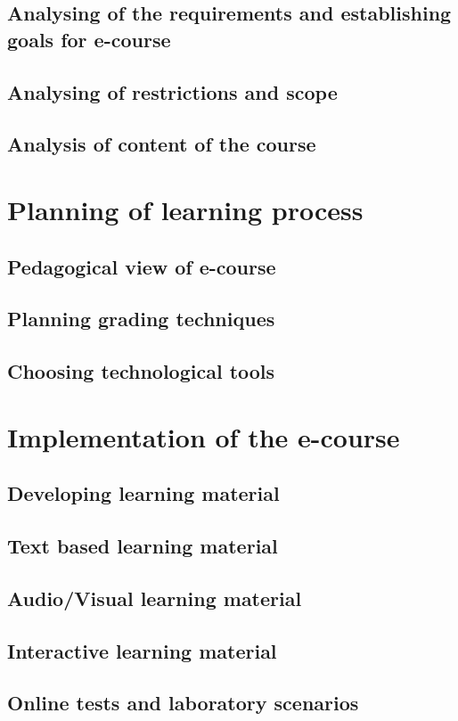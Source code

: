 \subsection{Analysing of the requirements and establishing goals for e-course}
\subsection{Analysing of restrictions and scope}
\subsection{Analysis of content of the course}
\section{Planning of learning process}
\subsection{Pedagogical view of e-course}
\subsection{Planning grading techniques}
\subsection{Choosing technological tools}

\section{Implementation of the e-course}

\subsection{Developing learning material}
\subsection{Text based learning material}
\subsection{Audio/Visual learning material}
\subsection{Interactive learning material}
\subsection{Online tests and laboratory scenarios}
